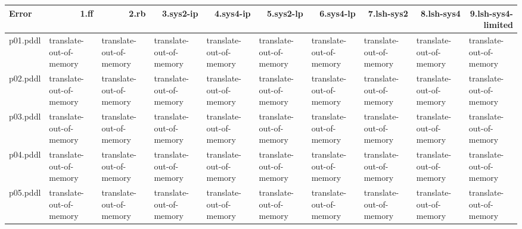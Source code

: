 \documentclass{article}
\begin{document}
\begin{tabular}{@{}lrrrrrrrrr@{}}
Error & 1.ff & 2.rb & 3.sys2-ip & 4.sys4-ip & 5.sys2-lp & 6.sys4-lp & 7.lsh-sys2 & 8.lsh-sys4 & 9.lsh-sys4-limited \\
\midrule
p01.pddl & \multicolumn{1}{|l|}{translate-out-of-memory} & \multicolumn{1}{|l|}{translate-out-of-memory} & \multicolumn{1}{|l|}{translate-out-of-memory} & \multicolumn{1}{|l|}{translate-out-of-memory} & \multicolumn{1}{|l|}{translate-out-of-memory} & \multicolumn{1}{|l|}{translate-out-of-memory} & \multicolumn{1}{|l|}{translate-out-of-memory} & \multicolumn{1}{|l|}{translate-out-of-memory} & \multicolumn{1}{|l|}{translate-out-of-memory} \\
p02.pddl & \multicolumn{1}{|l|}{translate-out-of-memory} & \multicolumn{1}{|l|}{translate-out-of-memory} & \multicolumn{1}{|l|}{translate-out-of-memory} & \multicolumn{1}{|l|}{translate-out-of-memory} & \multicolumn{1}{|l|}{translate-out-of-memory} & \multicolumn{1}{|l|}{translate-out-of-memory} & \multicolumn{1}{|l|}{translate-out-of-memory} & \multicolumn{1}{|l|}{translate-out-of-memory} & \multicolumn{1}{|l|}{translate-out-of-memory} \\
p03.pddl & \multicolumn{1}{|l|}{translate-out-of-memory} & \multicolumn{1}{|l|}{translate-out-of-memory} & \multicolumn{1}{|l|}{translate-out-of-memory} & \multicolumn{1}{|l|}{translate-out-of-memory} & \multicolumn{1}{|l|}{translate-out-of-memory} & \multicolumn{1}{|l|}{translate-out-of-memory} & \multicolumn{1}{|l|}{translate-out-of-memory} & \multicolumn{1}{|l|}{translate-out-of-memory} & \multicolumn{1}{|l|}{translate-out-of-memory} \\
p04.pddl & \multicolumn{1}{|l|}{translate-out-of-memory} & \multicolumn{1}{|l|}{translate-out-of-memory} & \multicolumn{1}{|l|}{translate-out-of-memory} & \multicolumn{1}{|l|}{translate-out-of-memory} & \multicolumn{1}{|l|}{translate-out-of-memory} & \multicolumn{1}{|l|}{translate-out-of-memory} & \multicolumn{1}{|l|}{translate-out-of-memory} & \multicolumn{1}{|l|}{translate-out-of-memory} & \multicolumn{1}{|l|}{translate-out-of-memory} \\
p05.pddl & \multicolumn{1}{|l|}{translate-out-of-memory} & \multicolumn{1}{|l|}{translate-out-of-memory} & \multicolumn{1}{|l|}{translate-out-of-memory} & \multicolumn{1}{|l|}{translate-out-of-memory} & \multicolumn{1}{|l|}{translate-out-of-memory} & \multicolumn{1}{|l|}{translate-out-of-memory} & \multicolumn{1}{|l|}{translate-out-of-memory} & \multicolumn{1}{|l|}{translate-out-of-memory} & \multicolumn{1}{|l|}{translate-out-of-memory} \\

\end{tabular}
\end{document}
